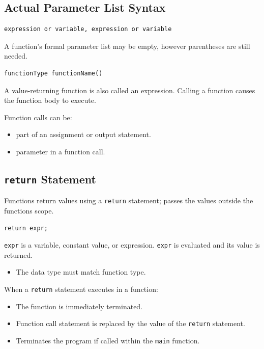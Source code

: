 \documentclass{article}
\begin{document}
\subsection{Actual Parameter List Syntax}
\begin{lstlisting}[caption={Syntax For Actual Parameter List}]
expression or variable, expression or variable
\end{lstlisting}

A function's formal parameter list may be empty, however parentheses are still
needed.
\begin{lstlisting}[caption={Empty Formal Parameter List Function Call}]
functionType functionName()
\end{lstlisting}

A value-returning function is also called an expression. Calling a function
causes the function body to execute.

\vspace{8pt}
Function calls can be:
\begin{itemize}
  \item part of an assignment or output statement.
  \item parameter in a function call.
\end{itemize}

\subsection{\texttt{return} Statement}
Functions return values using a \texttt{return} statement; passes the values
outside the functions scope.

\begin{lstlisting}[caption={\texttt{return} Statement Syntax}]
return expr;
\end{lstlisting}

\texttt{expr} is a variable, constant value, or expression. \texttt{expr} is
evaluated and its value is returned.
\begin{itemize}
  \item The data type must match function type.
\end{itemize}

When a \texttt{return} statement executes in a function:
\begin{itemize}
  \item The function is immediately terminated.
  \item Function call statement is replaced by the value of the \texttt{return}
    statement.
  \item Terminates the program if called within the \texttt{main} function.
\end{itemize}
\end{document}
